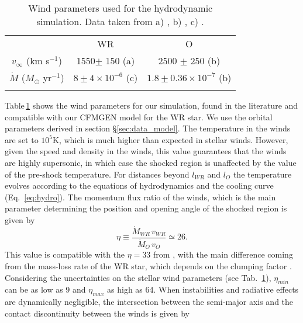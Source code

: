 \documentclass[usenatbib]{mnras}%
\begin{document}
\begin{table}
\caption[]{Wind parameters used for the hydrodynamic simulation. Data taken from a) \citet{1993ApJ...415..298S}, b) \citet{1999A&A...345..163D}, c) \citet{2007MNRAS.377..415N}.}
\label{tab:simu}
\begin{center}
\begin{tabular}{c c c}
\hline
\noalign{\smallskip}
 & WR & O \\
\noalign{\smallskip}
\hline
 \noalign{\smallskip}
 $v_{\infty}$ (km s$^{-1}$)  & 1550$\pm$ 150 (a) & 2500 $\pm$ 250 (b)\\
$\dot{M}$ ($M_{\odot}$ yr$^{-1}$) &  $8\pm 4 \times 10^{-6}$ (c)& $1.8\pm 0.36 \times10^{-7}$ (b) \\
\noalign{\smallskip}
\hline
\end{tabular}
\end{center}
\end{table}

Table\,\ref{tab:simu} shows the wind parameters for our simulation, found in the literature and compatible with our CFMGEN model for the WR star. We use the orbital parameters derived in section \S\ref{sec:data_model}. The temperature in the winds are set to $10^5$K, which is much higher than expected in stellar winds. However, given the speed and density in the winds, this value guarantees that the winds are highly supersonic, in which case the shocked region is unaffected by the value of the pre-shock temperature. For distances beyond $l_{WR}$ and $l_O$ the temperature evolves according to the equations of hydrodynamics and the cooling curve (Eq.~\ref{eq:hydro}). The momentum flux ratio of the winds, which is the main parameter determining the position and opening angle of the shocked region is given by \citep{1990FlDy...25..629L}
\begin{equation}\label{eq:eta}
\eta\equiv \frac{\dot{M}_{WR}\,v_{WR}}{\dot{M}_O\,v_O} \simeq 26.
\end{equation}	
This value is compatible with the $\eta=33$ from \citet{2000A&A...358..187D}, with the main difference coming from the mass-loss rate of the WR star, which depends on the clumping factor \citep{2004A&A...422..177S}.  Considering the uncertainties on the stellar wind parameters (see Tab.~\ref{tab:simu}), $\eta_{min}$ can be as low as 9 and  $\eta_{max}$ as high as 64. When instabilities and radiative effects are dynamically negligible, the intersection between the semi-major axis and the contact discontinuity between the winds is given by 
\end{document}
